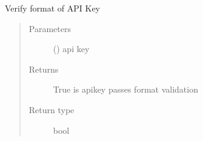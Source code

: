 \documentclass[letterpaper,10pt,english]{sphinxmanual}
\begin{document}

\begin{fulllineitems}
\label{\detokenize{code:bloxone.bloxone.verify_api_key}}
\sphinxAtStartPar
Verify format of API Key
\begin{quote}\begin{description}
\item[{Parameters}] \leavevmode
\sphinxAtStartPar
{} () \textendash{} api key

\item[{Returns}] \leavevmode
\sphinxAtStartPar
True is apikey passes format validation

\item[{Return type}] \leavevmode
\sphinxAtStartPar
bool

\end{description}\end{quote}

\end{fulllineitems}
\end{document}
